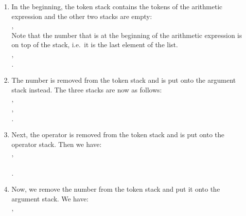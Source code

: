 \begin{enumerate}
\item In the beginning, the token stack contains the tokens of the arithmetic expression and the other two stacks
      are empty: \\[0.2cm]
      \hspace*{1.3cm} 
      , 
      \\[0.2cm]
      Note that the number that is at the beginning of the arithmetic expression is on top of the
      stack, i.e.~it is the last element of the list.  \\[0.2cm]
      \hspace*{1.3cm} , \\[0.2cm]
      \hspace*{1.3cm} . 
\item The number  is removed from the token stack and is put onto the argument stack
      instead.  The three stacks are now as follows: \\[0.2cm]
      \hspace*{1.3cm} , \\[0.2cm]
      \hspace*{1.3cm} , \\[0.2cm]
      \hspace*{1.3cm} . 
\item Next, the operator  is removed from the token stack and is put
      onto the operator stack.  Then we have: \\[0.2cm]
      \hspace*{1.3cm} , \\[0.2cm]
      \hspace*{1.3cm}  \\[0.2cm]
      \hspace*{1.3cm} . 
\item Now, we remove the number  from the  token stack and put it onto the argument stack.
      We have: \\[0.2cm]
      \hspace*{1.3cm} , \\[0.2cm]

\end{enumerate}
